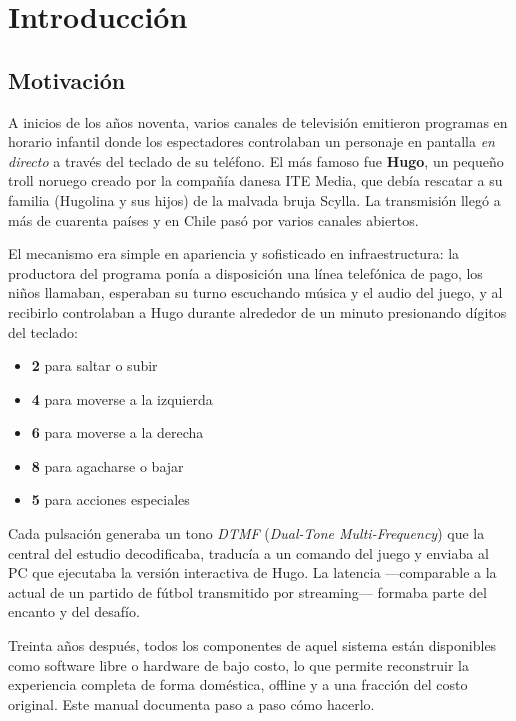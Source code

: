 \chapter{Introducción}

\section{Motivación}

A inicios de los años noventa, varios canales de televisión emitieron programas en horario infantil donde los espectadores controlaban un personaje en pantalla \emph{en directo} a través del teclado de su teléfono. El más famoso fue \textbf{Hugo}, un pequeño troll noruego creado por la compañía danesa ITE Media, que debía rescatar a su familia (Hugolina y sus hijos) de la malvada bruja Scylla. La transmisión llegó a más de cuarenta países y en Chile pasó por varios canales abiertos.

El mecanismo era simple en apariencia y sofisticado en infraestructura: la productora del programa ponía a disposición una línea telefónica de pago, los niños llamaban, esperaban su turno escuchando música y el audio del juego, y al recibirlo controlaban a Hugo durante alrededor de un minuto presionando dígitos del teclado:

\begin{itemize}
  \item \textbf{2} para saltar o subir
  \item \textbf{4} para moverse a la izquierda
  \item \textbf{6} para moverse a la derecha
  \item \textbf{8} para agacharse o bajar
  \item \textbf{5} para acciones especiales
\end{itemize}

Cada pulsación generaba un tono \emph{DTMF} (\emph{Dual-Tone Multi-Frequency}) que la central del estudio decodificaba, traducía a un comando del juego y enviaba al PC que ejecutaba la versión interactiva de Hugo. La latencia ---comparable a la actual de un partido de fútbol transmitido por streaming--- formaba parte del encanto y del desafío.

Treinta años después, todos los componentes de aquel sistema están disponibles como software libre o hardware de bajo costo, lo que permite reconstruir la experiencia completa de forma doméstica, offline y a una fracción del costo original. Este manual documenta paso a paso cómo hacerlo.

